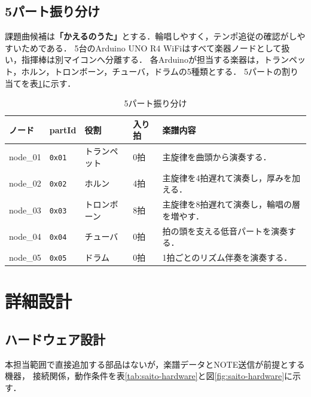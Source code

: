 \documentclass[uplatex,dvipdfmx]{jlreq}
\newcommand{\code}[1]{\texttt{#1}}
\begin{document}
\subsection{5パート振り分け}

課題曲候補は\textbf{「かえるのうた」}とする．輪唱しやすく，テンポ追従の確認がしやすいためである．
5台のArduino UNO R4 WiFiはすべて楽器ノードとして扱い，指揮棒は別マイコンへ分離する．
各Arduinoが担当する楽器は，トランペット，ホルン，トロンボーン，チューバ，ドラムの5種類とする．
5パートの割り当てを表\ref{tab:saito-part-map}に示す．

\begin{table}[H]
\centering
\caption{5パート振り分け}
\label{tab:saito-part-map}
\begin{tabular}{p{}p{}p{}p{}p{}}
\toprule
\textbf{ノード} & \textbf{partId} & \textbf{役割} & \textbf{入り拍} & \textbf{楽譜内容} \\
\midrule
node\_01 & \code{0x01} & トランペット & 0拍 & 主旋律を曲頭から演奏する．\\
node\_02 & \code{0x02} & ホルン & 4拍 & 主旋律を4拍遅れて演奏し，厚みを加える．\\
node\_03 & \code{0x03} & トロンボーン & 8拍 & 主旋律を8拍遅れて演奏し，輪唱の層を増やす．\\
node\_04 & \code{0x04} & チューバ & 0拍 & 拍の頭を支える低音パートを演奏する．\\
node\_05 & \code{0x05} & ドラム & 0拍 & 1拍ごとのリズム伴奏を演奏する．\\
\bottomrule
\end{tabular}
\end{table}

\section{詳細設計}

\subsection{ハードウェア設計}

本担当範囲で直接追加する部品はないが，楽譜データとNOTE送信が前提とする機器，
接続関係，動作条件を表\ref{tab:saito-hardware}と図\ref{fig:saito-hardware}に示す．
\end{document}
